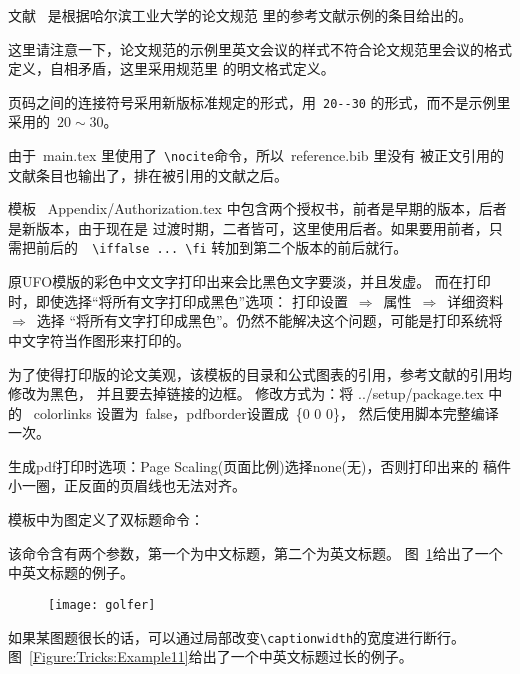 文献~  是根据哈尔滨工业大学的论文规范
里的参考文献示例的条目给出的。

这里请注意一下，论文规范的示例里英文会议的样式不符合论文规范里会议的格式定义，自相矛盾，这里采用规范里
的明文格式定义。

页码之间的连接符号采用新版标准规定的形式，用~\verb|20--30| 的形式，而不是示例里采用的~$20\sim 30$。

由于~main.tex 里使用了~\verb|\nocite|命令，所以~reference.bib 里没有
被正文引用的文献条目也输出了，排在被引用的文献之后。

模板 ~Appendix/Authorization.tex 中包含两个授权书，前者是早期的版本，后者是新版本，由于现在是
过渡时期，二者皆可，这里使用后者。如果要用前者，只需把前后的~\verb| \iffalse ... \fi|
转加到第二个版本的前后就行。


\label{Tricks:Print}

原UFO模版的彩色中文文字打印出来会比黑色文字要淡，并且发虚。
而在打印时，即使选择``将所有文字打印成黑色''选项：
打印设置~$\Rightarrow$~属性~$\Rightarrow$~详细资料~$\Rightarrow$~选择
``将所有文字打印成黑色''。仍然不能解决这个问题，可能是打印系统将中文字符当作图形来打印的。

为了使得打印版的论文美观，该模板的目录和公式图表的引用，参考文献的引用均修改为黑色，
并且要去掉链接的边框。
修改方式为：将 ../setup/package.tex 中的~ colorlinks 设置为~false，pdfborder设置成~\{0 0 0\}，
然后使用脚本完整编译一次。

生成pdf打印时选项：Page Scaling(页面比例)选择none(无)，否则打印出来的
稿件小一圈，正反面的页眉线也无法对齐。

\label{Tricks:Captions}
模板中为图定义了双标题命令：
\begin{verb}
\end{verb}
该命令含有两个参数，第一个为中文标题，第二个为英文标题。
图~\ref{Figure:Tricks:Example1}给出了一个中英文标题的例子。

\begin{figure}[htbp]
\centering
\texttt{[image: golfer]}
\label{Figure:Tricks:Example1}
\end{figure}

如果某图题很长的话，可以通过局部改变\verb|\captionwidth|的宽度进行断行。
图~\ref{Figure:Tricks:Example11}给出了一个中英文标题过长的例子。

